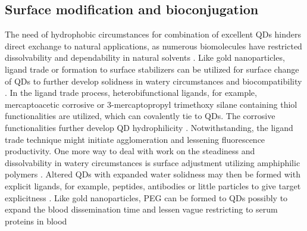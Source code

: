 \documentclass{article}
\begin{document}
\subsection*{ Surface modification and bioconjugation}
The need of hydrophobic circumstances for combination of excellent QDs hinders direct exchange to natural applications, as numerous biomolecules have restricted dissolvability and dependability in natural solvents . Like gold nanoparticles, ligand trade or formation to surface stabilizers can be utilized for surface change of QDs to further develop solidness in watery circumstances and biocompatibility . In the ligand trade process, heterobifunctional ligands, for example, mercaptoacetic corrosive or 3-mercaptopropyl trimethoxy silane containing thiol functionalities are utilized, which can covalently tie to QDs. The corrosive functionalities further develop QD hydrophilicity . Notwithstanding, the ligand trade technique might initiate agglomeration and lessening fluorescence productivity. One more way to deal with work on the steadiness and dissolvability in watery circumstances is surface adjustment utilizing amphiphilic polymers . Altered QDs with expanded water solidness may then be formed with explicit ligands, for example, peptides, antibodies or little particles to give target explicitness . Like gold nanoparticles, PEG can be formed to QDs possibly to expand the blood dissemination time and lessen vague restricting to serum proteins in blood
\begin{itemize}
     
    
\end{itemize}





 
 
\end{document}
